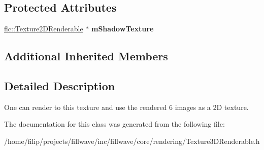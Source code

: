 \subsection*{Protected Attributes}
\begin{DoxyCompactItemize}
\item 
\mbox{\label{classflw_1_1flc_1_1Texture3DRenderable_a11a85d5786b2e207bccbb6a51f82ea9d}} 
\hyperlink{classflw_1_1flc_1_1Texture2DRenderable}{flc\+::\+Texture2\+D\+Renderable} $\ast$ {\bfseries m\+Shadow\+Texture}
\end{DoxyCompactItemize}
\subsection*{Additional Inherited Members}


\subsection{Detailed Description}
One can render to this texture and use the rendered 6 images as a 2D texture. 

The documentation for this class was generated from the following file\+:\begin{DoxyCompactItemize}
\item 
/home/filip/projects/fillwave/inc/fillwave/core/rendering/Texture3\+D\+Renderable.\+h\end{DoxyCompactItemize}
